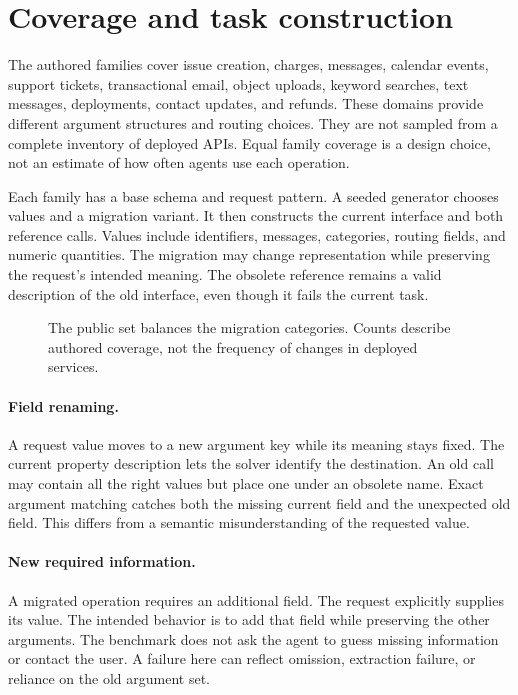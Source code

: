 \documentclass{article}
\begin{document}
\section{Coverage and task construction}
The authored families cover issue creation, charges, messages, calendar events, support tickets, transactional email, object uploads, keyword searches, text messages, deployments, contact updates, and refunds. These domains provide different argument structures and routing choices. They are not sampled from a complete inventory of deployed APIs. Equal family coverage is a design choice, not an estimate of how often agents use each operation.\par
Each family has a base schema and request pattern. A seeded generator chooses values and a migration variant. It then constructs the current interface and both reference calls. Values include identifiers, messages, categories, routing fields, and numeric quantities. The migration may change representation while preserving the request's intended meaning. The obsolete reference remains a valid description of the old interface, even though it fails the current task.\par
\begin{figure}[t]\centering
{}
\caption{The public set balances the migration categories. Counts describe authored coverage, not the frequency of changes in deployed services.}\label{fig:coverage}
\end{figure}
\paragraph{Field renaming.} A request value moves to a new argument key while its meaning stays fixed. The current property description lets the solver identify the destination. An old call may contain all the right values but place one under an obsolete name. Exact argument matching catches both the missing current field and the unexpected old field. This differs from a semantic misunderstanding of the requested value.
\paragraph{New required information.} A migrated operation requires an additional field. The request explicitly supplies its value. The intended behavior is to add that field while preserving the other arguments. The benchmark does not ask the agent to guess missing information or contact the user. A failure here can reflect omission, extraction failure, or reliance on the old argument set.
\end{document}
